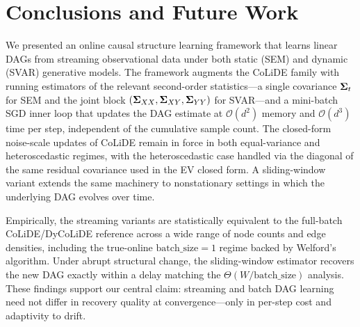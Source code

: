 \documentclass[journal,twoside]{IEEEtran}
\begin{document}
\section{Conclusions and Future Work}
\label{sec:conclusion}

We presented an online causal structure learning framework that learns
linear DAGs from streaming observational data under both static
(SEM) and dynamic (SVAR) generative models. The framework augments
the CoLiDE family with running estimators of the relevant second-order
statistics---a single covariance $\boldsymbol{\Sigma}_t$ for SEM and the joint
block $(\boldsymbol{\Sigma}_{XX}, \boldsymbol{\Sigma}_{XY},
\boldsymbol{\Sigma}_{YY})$ for SVAR---and a mini-batch SGD inner loop
that updates the DAG estimate at $\mathcal{O}(d^2)$ memory and
$\mathcal{O}(d^3)$ time per step, independent of the cumulative sample
count. The closed-form noise-scale updates of CoLiDE remain in force
in both equal-variance and heteroscedastic regimes, with the
heteroscedastic case handled via the diagonal of the same residual
covariance used in the EV closed form. A sliding-window variant
extends the same machinery to nonstationary settings in which the
underlying DAG evolves over time.

Empirically, the streaming variants are statistically equivalent to
the full-batch CoLiDE/DyCoLiDE reference across a wide range of node
counts and edge densities, including the true-online
$\mathrm{batch\_size} = 1$ regime backed by Welford's algorithm.
Under abrupt structural change, the sliding-window estimator recovers
the new DAG exactly within a delay matching the
$\Theta(W/\mathrm{batch\_size})$ analysis. These findings support our
central claim: streaming and batch DAG learning need not differ in
recovery quality at convergence---only in per-step cost and
adaptivity to drift.
\end{document}
